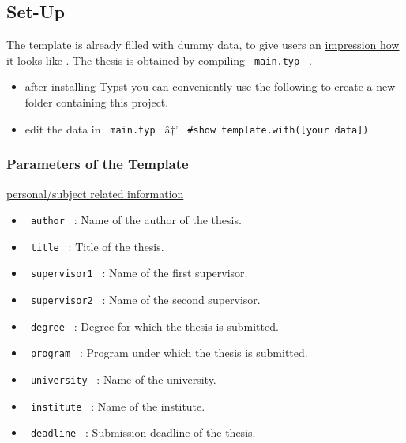 \subsection{Set-Up}\label{set-up}

The template is already filled with dummy data, to give users an
\href{https://github.com/sebaseb98/clean-math-thesis/blob/main/template/main.pdf}{impression
how it looks like} . The thesis is obtained by compiling
\texttt{\ main.typ\ } .

\begin{itemize}
\tightlist
\item
  after
  \href{https://github.com/typst/typst?tab=readme-ov-file\#installation}{installing
  Typst} you can conveniently use the following to create a new folder
  containing this project.
\end{itemize}

\begin{Shaded}
\begin{Highlighting}[]
\end{Highlighting}
\end{Shaded}

\begin{itemize}
\tightlist
\item
  edit the data in \texttt{\ main.typ\ } â†'
  \texttt{\ \#show\ template.with({[}your\ data{]})\ }
\end{itemize}

\subsubsection{Parameters of the
Template}\label{parameters-of-the-template}

\ul{personal/subject related information}

\begin{itemize}
\tightlist
\item
  \texttt{\ author\ } : Name of the author of the thesis.
\item
  \texttt{\ title\ } : Title of the thesis.
\item
  \texttt{\ supervisor1\ } : Name of the first supervisor.
\item
  \texttt{\ supervisor2\ } : Name of the second supervisor.
\item
  \texttt{\ degree\ } : Degree for which the thesis is submitted.
\item
  \texttt{\ program\ } : Program under which the thesis is submitted.
\item
  \texttt{\ university\ } : Name of the university.
\item
  \texttt{\ institute\ } : Name of the institute.
\item
  \texttt{\ deadline\ } : Submission deadline of the thesis.
\end{itemize}

